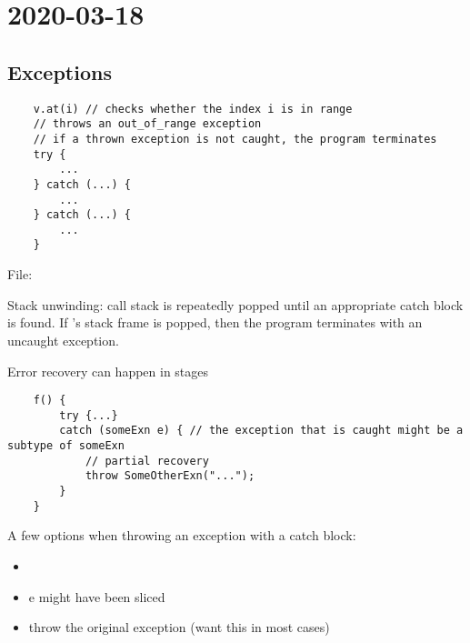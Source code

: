 \section{2020-03-18}
\subsection{Exceptions}
\begin{lstlisting}
    v.at(i) // checks whether the index i is in range
    // throws an out_of_range exception
    // if a thrown exception is not caught, the program terminates
    try {
        ...
    } catch (...) {
        ...
    } catch (...) {
        ...
    }
\end{lstlisting}
File: 

Stack unwinding: call stack is repeatedly popped until an appropriate
catch block is found. If 's stack frame is popped, then
the program terminates with an uncaught exception.

Error recovery can happen in stages
\begin{lstlisting}
    f() {
        try {...}
        catch (someExn e) { // the exception that is caught might be a subtype of someExn
            // partial recovery
            throw SomeOtherExn("...");
        }
    }
\end{lstlisting}
A few options when throwing an exception with a catch block:
\begin{itemize}
    \item {}
    \item {} \textrightarrow{} e might have been sliced
    \item {} \textrightarrow{} throw the original exception (want this in most cases)
\end{itemize}

